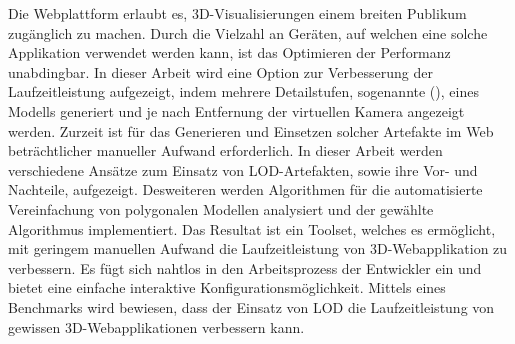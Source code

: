 Die Webplattform erlaubt es, 3D-Visualisierungen einem breiten Publikum zugänglich zu machen. Durch die Vielzahl an Geräten, auf welchen eine solche Applikation verwendet werden kann, ist das Optimieren der Performanz unabdingbar. In dieser Arbeit wird eine Option zur Verbesserung der Laufzeitleistung aufgezeigt, indem mehrere Detailstufen, sogenannte  (), eines Modells generiert und je nach Entfernung der virtuellen Kamera angezeigt werden. Zurzeit ist für das Generieren und Einsetzen solcher Artefakte im Web beträchtlicher manueller Aufwand erforderlich.
\bigbreak
In dieser Arbeit werden verschiedene Ansätze zum Einsatz von LOD-Artefakten, sowie ihre Vor- und Nachteile, aufgezeigt.
Desweiteren werden Algorithmen für die automatisierte Vereinfachung von polygonalen Modellen analysiert und der gewählte Algorithmus implementiert.
\bigbreak
Das Resultat ist ein Toolset, welches es ermöglicht, mit geringem manuellen Aufwand die Laufzeitleistung von 3D-Webapplikation zu verbessern.
Es fügt sich nahtlos in den Arbeitsprozess der Entwickler ein und bietet eine einfache interaktive Konfigurationsmöglichkeit.
Mittels eines Benchmarks wird bewiesen, dass der Einsatz von LOD die Laufzeitleistung von gewissen 3D-Webapplikationen verbessern kann.

